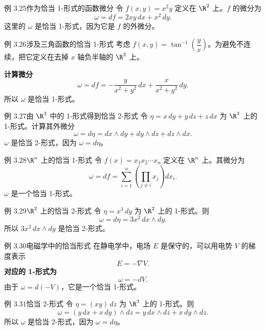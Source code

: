\begin{statement}{例 3.25}{作为恰当 1-形式的函数微分}
令 $f(x,y)=x^2y$ 定义在 $\R^2$ 上。$f$ 的微分为
\[
  \omega=df=2xy\,dx+x^2\,dy.
\]
这里的 $\omega$ 是恰当 1-形式，因为它是 $f$ 的外微分。
\end{statement}

\begin{statement}{例 3.26}{涉及三角函数的恰当 1-形式}
考虑 $f(x,y)=\tan^{-1}\!\left(\dfrac{y}{x}\right)$。为避免不连续，把它定义在去掉 $x$ 轴负半轴的 $\R^2$ 上。%

\noindent\textbf{计算微分}
\[
  \omega=df=-\frac{y}{x^2+y^2}\,dx+\frac{x}{x^2+y^2}\,dy.
\]
所以 $\omega$ 是恰当 1-形式。
\end{statement}

\begin{statement}{例 3.27}{由 $\R^3$ 中的 1-形式得到恰当 2-形式}
令 $\eta=x\,dy+y\,dz+z\,dx$ 为 $\R^3$ 上的 1-形式。计算其外微分
\[
  \omega=d\eta=dx\wedge dy+dy\wedge dz+dz\wedge dx.
\]
$\omega$ 是恰当 2-形式，因为 $\omega=d\eta$。
\end{statement}

\begin{statement}{例 3.28}{$\R^n$ 上的恰当 1-形式}
令 $f(x)=x_1x_2\cdots x_n$ 定义在 $\R^n$ 上。其微分为
\[
  \omega=df=\sum_{i=1}^n\left(\prod_{j\ne i}x_j\right)dx_i.
\]
$\omega$ 是一个恰当 1-形式。
\end{statement}

\begin{statement}{例 3.29}{$\R^2$ 上的恰当 2-形式}
令 $\eta=x^3\,dy$ 为 $\R^2$ 上的 1-形式。则
\[
  \omega=d\eta=3x^2\,dx\wedge dy.
\]
所以 $3x^2\,dx\wedge dy$ 是恰当 2-形式。
\end{statement}

\begin{statement}{例 3.30}{电磁学中的恰当形式}
在静电学中，电场 $E$ 是保守的，可以用电势 $V$ 的梯度表示
\begin{equation*}
  E=-\nabla V.
  \tag{3.4}\label{eq:3.4}
\end{equation*}
\noindent\textbf{对应的 1-形式为}
\[
  \omega=-dV.
\]
由于 $\omega=d(-V)$，它是一个恰当 1-形式。
\end{statement}

\begin{statement}{例 3.31}{恰当 2-形式}
令 $\eta=(xy)\,dz$ 为 $\R^3$ 上的 1-形式。则
\[
  \omega=(y\,dx+x\,dy)\wedge dz=y\,dx\wedge dz+x\,dy\wedge dz.
\]
所以 $\omega$ 是恰当 2-形式，因为 $\omega=d\eta$。
\end{statement}

